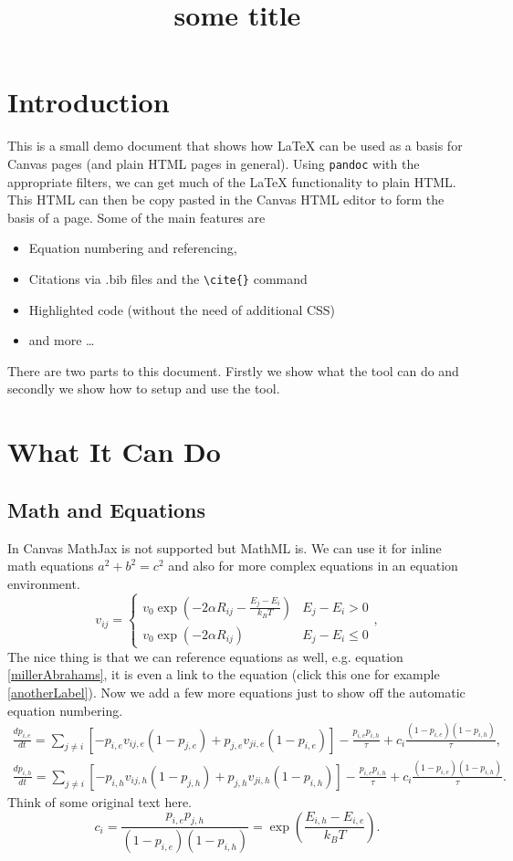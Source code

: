 \documentclass[11pt, a4paper]{article}
\title{some title}
\begin{document}
	
	\section{Introduction}
	This is a small demo document that shows how LaTeX can be used as a basis for Canvas pages (and plain HTML pages in general). Using \lstinline|pandoc| with the appropriate filters, we can get much of the LaTeX functionality to plain HTML. This HTML can then be copy pasted in the Canvas HTML editor to form the basis of a page. Some of the main features are
	\begin{itemize}
		\item Equation numbering and referencing,
		\item Citations via .bib files and the \lstinline|\cite{}| command
		\item Highlighted code (without the need of additional CSS)
		\item and more \ldots
	\end{itemize}
	
	\noindent
	There are two parts to this document. Firstly we show what the tool can do and secondly we show how to setup and use the tool.
	
	\section{What It Can Do}
	
	\subsection{Math and Equations}
	In Canvas MathJax is not supported but MathML is. We can use it for inline math equations $a^2+b^2 = c^2$ and also for more complex equations in an equation environment.
	\begin{equation}
	v_{ij}=
	\begin{cases} 
	v_0 \exp(-2\alpha R_{ij} - \frac{E_j - E_i}{k_B T}) &  E_j-E_i > 0\\
	v_0 \exp(-2\alpha R_{ij}) & E_j-E_i \leq 0
	\end{cases}, \label{millerAbrahams}
	\end{equation}
	The nice thing is that we can reference equations as well, e.g. equation \ref{millerAbrahams}, it is even a link to the equation (click this one for example \ref{anotherLabel}). Now we add a few more equations just to show off the automatic equation numbering.
	\begin{align}
	\frac{dp_{i,e}}{dt} = \sum_{j\neq i} \left[ -p_{i,e} v_{ij,e} (1-p_{j,e}) + p_{j,e} v_{ji,e}  (1-p_{i,e}) \right] - \frac{p_{i,e}p_{i,h}}{\tau} + c_i\frac{(1-p_{i,e})(1-p_{i,h})}{\tau}, \label{eq:electronME} \\
	\frac{dp_{i,h}}{dt} = \sum_{j\neq i} \left[ -p_{i,h} v_{ij,h} (1-p_{j,h}) + p_{j,h} v_{ji,h}  (1-p_{i,h}) \right] - \frac{p_{i,e}p_{i,h}}{\tau} + c_i\frac{(1-p_{i,e})(1-p_{i,h})}{\tau}.
	\end{align}
	Think of some original text here.
	\begin{equation}
	c_i = \frac{p_{i,e}p_{j,h}}{(1-p_{i,e})(1-p_{i,h})} = \exp\left(\frac{E_{i,h} - E_{i,e}}{k_B T}\right). \label{anotherLabel}
	\end{equation}
	
\end{document}
